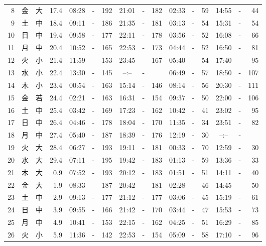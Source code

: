 \documentclass[12pt.a4j]{jsarticle}
\begin{document}
\begin{center}
\begin{table}[ht]
\begin{tabular}{|rc|cr|ccrccr|ccrccr|}
 8 & 金 & 大 & 17.4 &  08:28 &-& 192  &  21:01 &-& 182  &   02:33 &-&  59  &   14:55 &-&  44  \\
 9 & 土 & 中 & 18.4 &  09:11 &-& 186  &  21:35 &-& 181  &   03:13 &-&  54  &   15:31 &-&  54  \\
10 & 日 & 中 & 19.4 &  09:58 &-& 177  &  22:11 &-& 178  &   03:56 &-&  52  &   16:08 &-&  66  \\
11 & 月 & 中 & 20.4 &  10:52 &-& 165  &  22:53 &-& 173  &   04:44 &-&  52  &   16:50 &-&  81  \\
12 & 火 & 小 & 21.4 &  11:59 &-& 153  &  23:45 &-& 167  &   05:40 &-&  54  &   17:40 &-&  95  \\
13 & 水 & 小 & 22.4 &  13:30 &-& 145  &  --:-- &-&     &   06:49 &-&  57  &   18:50 &-& 107  \\
14 & 木 & 小 & 23.4 &  00:54 &-& 163  &  15:14 &-& 146  &   08:14 &-&  56  &   20:30 &-& 111  \\
15 & 金 & 若 & 24.4 &  02:21 &-& 163  &  16:31 &-& 154  &   09:37 &-&  50  &   22:00 &-& 106  \\
16 & 土 & 中 & 25.4 &  03:42 &-& 169  &  17:23 &-& 162  &   10:42 &-&  41  &   23:02 &-&  95  \\
17 & 日 & 中 & 26.4 &  04:46 &-& 178  &  18:04 &-& 170  &   11:35 &-&  34  &   23:51 &-&  82  \\
18 & 月 & 中 & 27.4 &  05:40 &-& 187  &  18:39 &-& 176  &   12:19 &-&  30  &   --:-- &-&     \\
19 & 火 & 大 & 28.4 &  06:27 &-& 193  &  19:11 &-& 181  &   00:33 &-&  70  &   12:59 &-&  30  \\
20 & 水 & 大 & 29.4 &  07:11 &-& 195  &  19:42 &-& 183  &   01:13 &-&  59  &   13:36 &-&  33  \\
21 & 木 & 大 &  0.9 &  07:52 &-& 193  &  20:12 &-& 183  &   01:51 &-&  51  &   14:11 &-&  40  \\
22 & 金 & 大 &  1.9 &  08:33 &-& 187  &  20:42 &-& 181  &   02:28 &-&  46  &   14:45 &-&  50  \\
23 & 土 & 中 &  2.9 &  09:13 &-& 177  &  21:12 &-& 177  &   03:06 &-&  45  &   15:19 &-&  61  \\
24 & 日 & 中 &  3.9 &  09:55 &-& 166  &  21:42 &-& 170  &   03:44 &-&  47  &   15:53 &-&  73  \\
25 & 月 & 中 &  4.9 &  10:41 &-& 153  &  22:15 &-& 162  &   04:25 &-&  51  &   16:29 &-&  85  \\
26 & 火 & 小 &  5.9 &  11:36 &-& 142  &  22:53 &-& 154  &   05:09 &-&  58  &   17:10 &-&  96  \\

\end{tabular}
\end{table}
\end{center}
\end{document}
